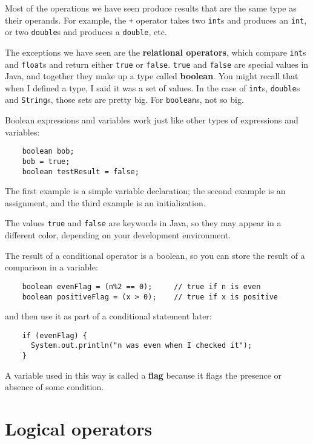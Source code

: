 \documentclass[12pt]{book}
\theoremstyle{definition}
\begin{document}
Most of the operations we have seen produce results that are
the same type as their operands.  For example, the {\tt +} operator
takes two {\tt int}s and produces an {\tt int}, or two {\tt double}s
and produces a {\tt double}, etc.


The exceptions we have seen are the {\bf relational operators}, which
compare {\tt int}s and {\tt float}s and return either {\tt true} or
{\tt false}.  {\tt true} and {\tt false} are special values in Java,
and together they make up a type called {\bf boolean}.  You might
recall that when I defined a type, I said it was a set of values.  In
the case of {\tt int}s, {\tt double}s and {\tt String}s, those sets
are pretty big.  For {\tt boolean}s, not so big.

Boolean expressions and variables work just like other types of
expressions and variables:

\begin{lstlisting}
    boolean bob;
    bob = true;
    boolean testResult = false;
\end{lstlisting}
%
The first example is a simple variable declaration;
the second example is an assignment, and the third example is an
initialization.

The values {\tt true} and {\tt false}
are keywords in Java, so they may appear in a different color,
depending on your development environment.


The result of a conditional operator is a boolean,
so you can store the result of a comparison in a variable:

\begin{lstlisting}
    boolean evenFlag = (n%2 == 0);     // true if n is even
    boolean positiveFlag = (x > 0);    // true if x is positive
\end{lstlisting}
%
and then use it as part of a conditional statement later:

\begin{lstlisting}
    if (evenFlag) {
      System.out.println("n was even when I checked it");
    }
\end{lstlisting}
%
A variable used in this way is called a {\bf flag}
because it flags the presence or absence of some condition.


\section{Logical operators}
\end{document}
